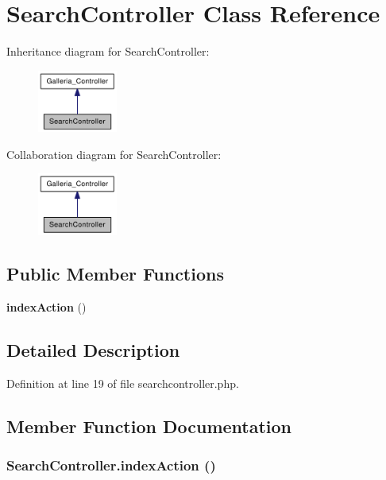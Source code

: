 \section{SearchController Class Reference}
\label{classSearchController}
Inheritance diagram for SearchController:\nopagebreak
\begin{figure}[H]
\begin{center}
\leavevmode
\includegraphics[width=74pt]{classSearchController__inherit__graph}
\end{center}
\end{figure}
Collaboration diagram for SearchController:\nopagebreak
\begin{figure}[H]
\begin{center}
\leavevmode
\includegraphics[width=74pt]{classSearchController__coll__graph}
\end{center}
\end{figure}
\subsection*{Public Member Functions}
\begin{CompactItemize}
\item 
{\bf indexAction} ()
\end{CompactItemize}


\subsection{Detailed Description}


Definition at line 19 of file searchcontroller.php.

\subsection{Member Function Documentation}
\subsubsection{\setlength{\rightskip}{0pt plus 5cm}SearchController.indexAction ()}\label{classSearchController_23220fa63c8d9c3ccad8c50cd6a7195e}


